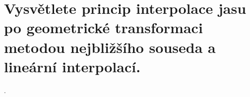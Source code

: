 \section{Vysvětlete princip interpolace jasu po geometrické transformaci metodou nejbližšího souseda a lineární 
interpolací.}.